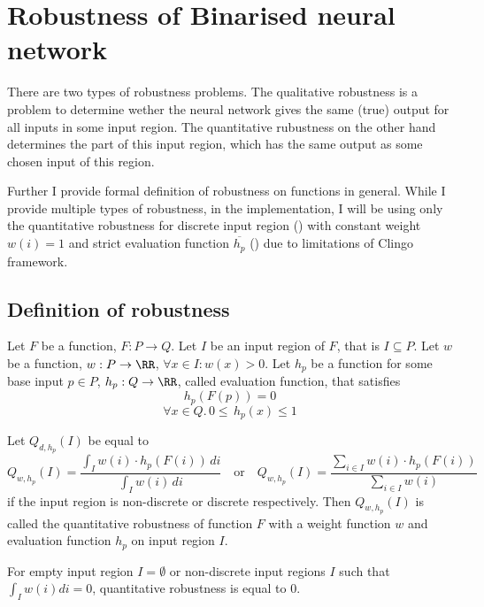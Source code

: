 \section{Robustness of Binarised neural network}

There are two types of robustness problems. The qualitative robustness
is a problem to determine wether the neural network gives the same (true)
output for all inputs in some input region. The quantitative rubustness
on the other hand determines the part of this input region, which has
the same output as some chosen input of this region.

Further I provide formal definition of robustness on functions in general.
While I provide multiple types of robustness, in the implementation,
I will be using only the quantitative robustness for discrete input region
() with constant weight $w(i) = 1$
and strict evaluation function $\overline{h_p}$ ()
due to limitations of Clingo framework.

\subsection{Definition of robustness}

\begin{definition}\label{def:quantitative_robustness}
    Let $F$ be a function, $F: P \to Q$.
    Let $I$ be an input region of $F$, that is $I \subseteq P$.
    Let $w$ be a function, $w: P\to \RR$, $\forall x\in I: w(x) > 0$.
    Let $h_p$ be a function for some base input $p\in P$, $h_p: Q\to \RR$, called evaluation
    function, that satisfies
    \begin{equation*}
        h_p(F(p)) = 0
    \end{equation*}
    \begin{equation*}
        \forall x\in Q .\, 0 \leq \, h_p(x) \leq 1 
    \end{equation*}

    \noindent
    Let $Q_{d, h_p}(I)$ be equal to
    \begin{equation*}
        Q_{w, h_p}(I) = \frac{\int_I w(i)\cdot h_p(F(i)) \, di}{\int_I w(i) \, di}
        \hspace{1em} \text{or} \hspace{1em}
        Q_{w, h_p}(I) = \frac{\sum_{i\in I} w(i)\cdot h_p(F(i))}{\sum_{i\in I} w(i)}
    \end{equation*}
    if the input region is non-discrete or discrete respectively.
    Then $Q_{w, h_p}(I)$ is called the quantitative robustness of function $F$
    with a weight function $w$ and evaluation function $h_p$ on input region $I$.

    For empty input region $I = \emptyset$
    or non-discrete input regions $I$ such that $\int_I w(i) di = 0$,
    quantitative robustness is equal to $0$.
\end{definition}

